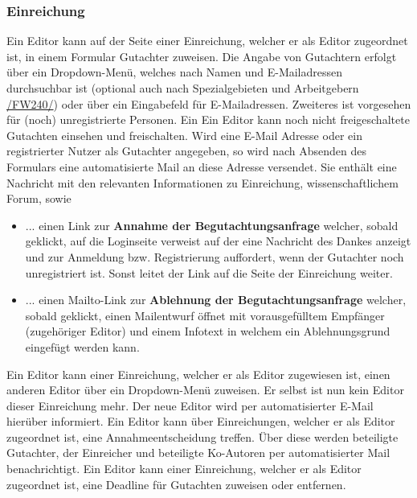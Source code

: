 \subsubsection{Einreichung}
\begin{description}
     Ein Editor kann auf der Seite einer Einreichung, welcher er als Editor zugeordnet ist,
    in einem Formular Gutachter zuweisen. Die Angabe von Gutachtern erfolgt über ein Dropdown-Menü, welches
    nach Namen und E-Mailadressen durchsuchbar ist (optional auch nach Spezialgebieten und Arbeitgebern \hyperref[funkt:240]{/FW240/})
    oder über ein Eingabefeld für E-Mailadressen. Zweiteres ist vorgesehen für (noch) unregistrierte Personen.
     Ein Ein Editor kann noch nicht freigeschaltete Gutachten einsehen und freischalten.
     Wird eine E-Mail Adresse oder ein registrierter Nutzer als Gutachter angegeben,
    so wird nach Absenden des Formulars eine automatisierte Mail an diese Adresse versendet. Sie enthält eine Nachricht mit den relevanten
    Informationen zu Einreichung, wissenschaftlichem Forum, sowie
    \begin{itemize}
        \item ... einen Link zur \textbf{Annahme der Begutachtungsanfrage} welcher, sobald geklickt,
        auf die Loginseite verweist auf der eine Nachricht des Dankes anzeigt und zur Anmeldung bzw.
        Registrierung auffordert, wenn der Gutachter noch unregistriert ist. Sonst leitet der Link auf die Seite der
        Einreichung weiter. %
        \item ... einen Mailto-Link zur \textbf{Ablehnung der Begutachtungsanfrage} welcher, sobald
        geklickt, einen Mailentwurf öffnet mit vorausgefülltem Empfänger (zugehöriger Editor)
        und einem Infotext in welchem ein Ablehnungsgrund eingefügt werden kann.
    \end{itemize}
     Ein Editor kann einer Einreichung, welcher er als Editor zugewiesen ist, einen anderen Editor
    über ein Dropdown-Menü zuweisen. Er selbst ist nun kein Editor dieser Einreichung mehr. Der neue Editor wird per
    automatisierter E-Mail hierüber informiert.
     Ein Editor kann über Einreichungen, welcher er als Editor zugeordnet ist,
    eine Annahmeentscheidung treffen. Über diese werden beteiligte Gutachter, der Einreicher und beteiligte Ko-Autoren
    per automatisierter Mail benachrichtigt.
     Ein Editor kann einer Einreichung, welcher er als Editor zugeordnet ist, eine Deadline für
    Gutachten zuweisen oder entfernen.
\end{description}

